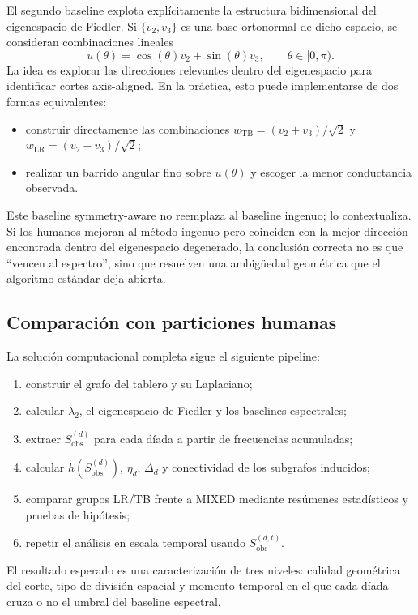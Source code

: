 \documentclass[conference]{IEEEtran}
\begin{document}
El segundo baseline explota explícitamente la estructura bidimensional del eigenespacio de Fiedler. Si $\{v_2,v_3\}$ es una base ortonormal de dicho espacio, se consideran combinaciones lineales
\begin{equation}
u(\theta)=\cos(\theta)v_2+\sin(\theta)v_3, \qquad \theta \in [0,\pi).
\end{equation}
La idea es explorar las direcciones relevantes dentro del eigenespacio para identificar cortes axis-aligned. En la práctica, esto puede implementarse de dos formas equivalentes:
\begin{itemize}
    \item construir directamente las combinaciones $w_{\mathrm{TB}}=(v_2+v_3)/\sqrt{2}$ y $w_{\mathrm{LR}}=(v_2-v_3)/\sqrt{2}$;
    \item realizar un barrido angular fino sobre $u(\theta)$ y escoger la menor conductancia observada.
\end{itemize}
Este baseline symmetry-aware no reemplaza al baseline ingenuo; lo contextualiza. Si los humanos mejoran al método ingenuo pero coinciden con la mejor dirección encontrada dentro del eigenespacio degenerado, la conclusión correcta no es que ``vencen al espectro'', sino que resuelven una ambigüedad geométrica que el algoritmo estándar deja abierta.

\subsection{Comparación con particiones humanas}

La solución computacional completa sigue el siguiente pipeline:
\begin{enumerate}
    \item construir el grafo del tablero y su Laplaciano;
    \item calcular $\lambda_2$, el eigenespacio de Fiedler y los baselines espectrales;
    \item extraer $S_{\mathrm{obs}}^{(d)}$ para cada díada a partir de frecuencias acumuladas;
    \item calcular $h(S_{\mathrm{obs}}^{(d)})$, $\eta_d$, $\Delta_d$ y conectividad de los subgrafos inducidos;
    \item comparar grupos LR/TB frente a MIXED mediante resúmenes estadísticos y pruebas de hipótesis;
    \item repetir el análisis en escala temporal usando $S_{\mathrm{obs}}^{(d,t)}$.
\end{enumerate}
El resultado esperado es una caracterización de tres niveles: calidad geométrica del corte, tipo de división espacial y momento temporal en el que cada díada cruza o no el umbral del baseline espectral.
\end{document}
